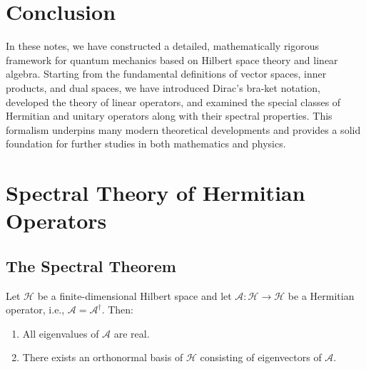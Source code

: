 	\chapter{Conclusion}
	
	In these notes, we have constructed a detailed, mathematically rigorous framework for quantum mechanics based on Hilbert space theory and linear algebra. Starting from the fundamental definitions of vector spaces, inner products, and dual spaces, we have introduced Dirac's bra-ket notation, developed the theory of linear operators, and examined the special classes of Hermitian and unitary operators along with their spectral properties. This formalism underpins many modern theoretical developments and provides a solid foundation for further studies in both mathematics and physics.
	
	
	\chapter{Spectral Theory of Hermitian Operators}
	
	\section{The Spectral Theorem}
	\begin{theorem}
		Let \(\mathcal{H}\) be a finite-dimensional Hilbert space and let \(\mathcal{A}:\mathcal{H}\to\mathcal{H}\) be a Hermitian operator, i.e., \(\mathcal{A} = \mathcal{A}^\dagger\). Then:
		\begin{enumerate}
			\item All eigenvalues of \(\mathcal{A}\) are real.
			\item There exists an orthonormal basis of \(\mathcal{H}\) consisting of eigenvectors of \(\mathcal{A}\).
		\end{enumerate}
	\end{theorem}
	
